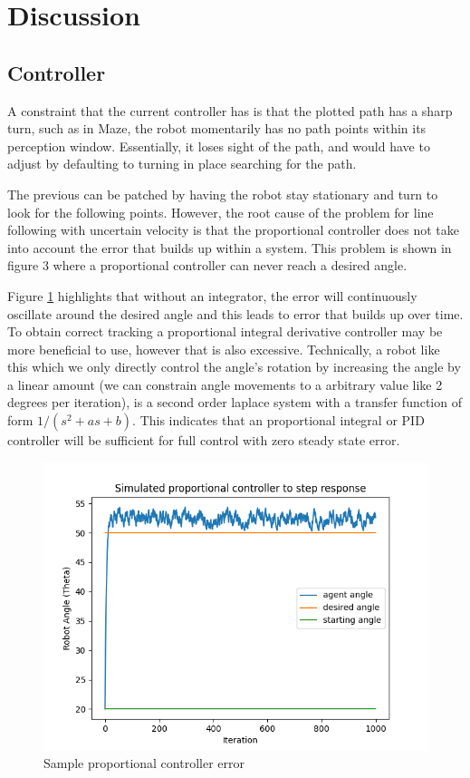 \documentclass[11pt]{article}
\begin{document}
\section{Discussion}
    \subsection{Controller}
    A constraint that the current controller has is that the plotted path has a
    sharp turn, such as in Maze, the robot momentarily has no path points within
    its perception window. Essentially, it loses sight of the path, and would
    have to adjust by defaulting to turning in place searching for the path. 
    
    The previous can be patched by having the robot stay stationary and turn to
    look for the following points. However, the root cause of the problem for
    line following with uncertain velocity is that the proportional controller
    does not take into account the error that builds up within a system. This
    problem is shown in figure 3 where a proportional controller can never reach
    a desired angle.
    
    Figure \ref{fig:prop_controller} highlights that without an integrator, the
    error will continuously oscillate around the desired angle and this leads to
    error that builds up over time. To obtain correct tracking a proportional
    integral derivative controller may be more beneficial to use, however that
    is also excessive. Technically, a robot like this which we only directly
    control the angle’s rotation by increasing the angle by a linear amount (we
    can constrain angle movements to a arbitrary value like 2 degrees per
    iteration), is a second order laplace system with a transfer function of
    form \( 1/(s^2+as+b) \). This indicates that an proportional integral or PID
    controller will be sufficient for full control with zero steady state error.

    \begin{figure}[ht]
        \centering
        \includegraphics[scale=0.4]{figures/Sample proportional controller error.png}
        \caption{Sample proportional controller error}
        \label{fig:prop_controller}
    \end{figure}
\end{document}
